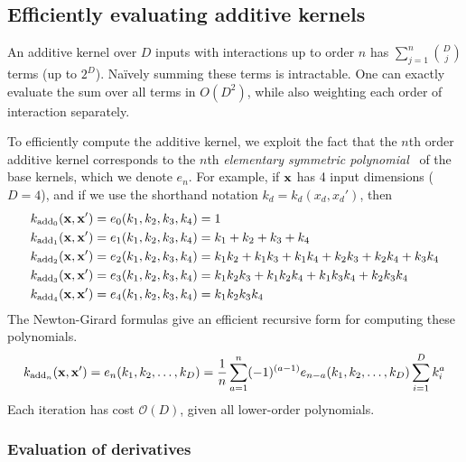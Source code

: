\subsection{Efficiently evaluating additive kernels}
An additive kernel over $D$ inputs with interactions up to order $n$ has $\sum_{j=1}^{n} {D \choose j}$ terms (up to $2^D$).
Na\"{i}vely summing these terms is intractable.
One can exactly evaluate the sum over all terms in $O(D^2)$, while also weighting each order of interaction separately.

To efficiently compute the additive kernel, we exploit the fact that the $n$th order additive kernel corresponds to the $n$th \textit{elementary symmetric polynomial}~\citep{macdonald1998symmetric}
of the base kernels, which we denote $e_n$.
For example, if ${\bf{x}}$ has 4 input dimensions ($D = 4$), and if we use the shorthand notation $k_d = k_d(x_d, x_d')$, then
%
\begin{align}
k_{\textnormal{add}_0}({\bf x, x'}) & = e_0( k_1, k_2, k_3, k_4 ) = 1 \\
k_{\textnormal{add}_1}({\bf x, x'}) & = e_1( k_1, k_2, k_3, k_4 ) = k_1 + k_2 + k_3 + k_4 \\
k_{\textnormal{add}_2}({\bf x, x'}) & = e_2( k_1, k_2, k_3, k_4 ) = k_1 k_2 + k_1 k_3 + k_1k_4 + k_2 k_3 + k_2 k_4 + k_3 k_4 \\
k_{\textnormal{add}_3}({\bf x, x'}) & = e_3( k_1, k_2, k_3, k_4 ) = k_1 k_2 k_3 + k_1 k_2 k_4 + k_1 k_3 k_4 + k_2 k_3 k_4 \\
k_{\textnormal{add}_4}({\bf x, x'}) & = e_4( k_1, k_2, k_3, k_4 ) = k_1 k_2 k_3 k_4
\end{align}
%
The Newton-Girard formulas give an efficient recursive form for computing these polynomials.
%
\begin{align}
k_{\textnormal{add}_n}({\bf x, x'}) = e_n(k_1,k_2,\dots,k_D) = \frac{1}{n} \sum_{a=1}^n (-1)^{(a-1)} e_{n-a}(k_1, k_2, \dots,k_D)  \sum_{i=1}^Dk_i^a
\end{align}
%
Each iteration has cost $\mathcal{O}(D)$, given all lower-order polynomials.


\subsubsection{Evaluation of derivatives}

